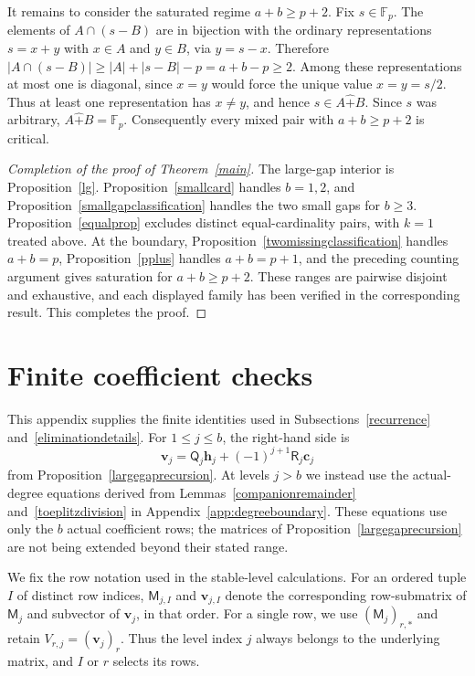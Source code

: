 \documentclass[10pt,a4paper]{amsart}
\newcommand{\F}{\mathbb{F}_p}
\newcommand{\rs}{\mathbin{\widehat+}}
\begin{document}
It remains to consider the saturated regime $a+b\ge p+2$.
Fix $s\in\F$.  The elements of $A\cap(s-B)$ are in bijection with the
ordinary representations $s=x+y$ with $x\in A$ and $y\in B$, via
$y=s-x$.  Therefore $|A\cap(s-B)|\ge |A|+|s-B|-p=a+b-p\ge2$.
Among these representations at most one is diagonal, since $x=y$ would
force the unique value $x=y=s/2$.  Thus at least one representation has
$x\ne y$, and hence $s\in A\rs B$.  Since $s$ was arbitrary,
$A\rs B=\F$.  Consequently every mixed pair with $a+b\ge p+2$ is critical.


\begin{proof}[Completion of the proof of Theorem~\ref{main}]
The large-gap interior is Proposition~\ref{lg}.  Proposition~\ref{smallcard}
handles $b=1,2$, and Proposition~\ref{smallgapclassification} handles
the two small gaps for $b\ge3$.  Proposition~\ref{equalprop} excludes
distinct equal-cardinality pairs, with $k=1$ treated above.  At the
boundary, Proposition~\ref{twomissingclassification} handles $a+b=p$,
Proposition~\ref{pplus} handles $a+b=p+1$, and the preceding counting
argument gives saturation for $a+b\ge p+2$.  These ranges are pairwise
disjoint and exhaustive, and each displayed family has been verified in
the corresponding result.  This completes the proof.
\end{proof}


\appendix
\section{Finite coefficient checks}\label{app:finitechecks}

This appendix supplies the finite identities used in
Subsections~\ref{recurrence} and~\ref{eliminationdetails}.  For
$1\le j\le b$, the right-hand side is
\[
 \mathbf v_j=\mathsf Q_j\mathbf h_j+(-1)^{j+1}\mathsf R_j\mathbf c_j
\]
from Proposition~\ref{largegaprecursion}.  At levels $j>b$ we instead
use the actual-degree equations derived from
Lemmas~\ref{companionremainder} and~\ref{toeplitzdivision} in
Appendix~\ref{app:degreeboundary}.  These equations use only the $b$ actual coefficient rows; the matrices of Proposition~\ref{largegaprecursion}
are not being extended beyond their stated range.

We fix the row notation used in the stable-level calculations.  For an
ordered tuple $I$ of distinct row indices, $\mathsf M_{j,I}$ and
$\mathbf v_{j,I}$ denote the corresponding row-submatrix of
$\mathsf M_j$ and subvector of $\mathbf v_j$, in that order.
For a single row, we use $(\mathsf M_j)_{r,*}$ and retain
$V_{r,j}=(\mathbf v_j)_r$.  Thus the level index $j$ always belongs
to the underlying matrix, and $I$ or $r$ selects its rows.
\end{document}
